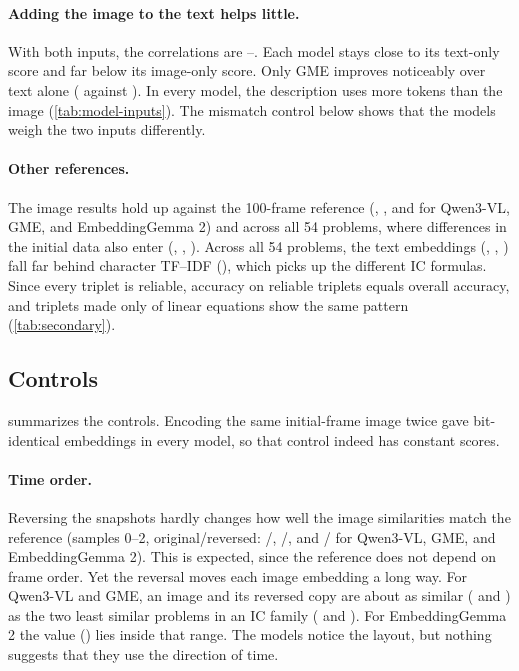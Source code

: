 \paragraph{Adding the image to the text helps little.}
With both inputs, the correlations are \spBothMin--\spBothMax{}. Each model stays close to its text-only score and far below its image-only score. Only GME improves noticeably over text alone (\spGmeBoth{} against \spGmeText{}). In every model, the description uses more tokens than the image (\cref{tab:model-inputs}). The mismatch control below shows that the models weigh the two inputs differently.

\paragraph{Other references.}
The image results hold up against the 100-frame reference (\spQwImageHund{}, \spGmeImageHund{}, and \spGemImageHund{} for Qwen3-VL, GME, and EmbeddingGemma 2) and across all 54 problems, where differences in the initial data also enter (\spQwImageFull{}, \spGmeImageFull{}, \spGemImageFull{}). Across all 54 problems, the text embeddings (\spQwTextFull{}, \spGmeTextFull{}, \spGemTextFull{}) fall far behind character TF--IDF (\spTfidfFull{}), which picks up the different IC formulas. Since every triplet is reliable, accuracy on reliable triplets equals overall accuracy, and triplets made only of linear equations show the same pattern (\cref{tab:secondary}).

\subsection{Controls}
 summarizes the controls. Encoding the same initial-frame image twice gave bit-identical embeddings in every model, so that control indeed has constant scores.

\paragraph{Time order.}
Reversing the snapshots hardly changes how well the image similarities match the reference (samples 0--2, original/reversed: \revOrigQw{}/\revRevQw{}, \revOrigGme{}/\revRevGme{}, and \revOrigGem{}/\revRevGem{} for Qwen3-VL, GME, and EmbeddingGemma 2). This is expected, since the reference does not depend on frame order. Yet the reversal moves each image embedding a long way. For Qwen3-VL and GME, an image and its reversed copy are about as similar (\revSelfQw{} and \revSelfGme{}) as the two least similar problems in an IC family (\rangeLoQwImage{} and \rangeLoGmeImage{}). For EmbeddingGemma 2 the value (\revSelfGem{}) lies inside that range. The models notice the layout, but nothing suggests that they use the direction of time.

